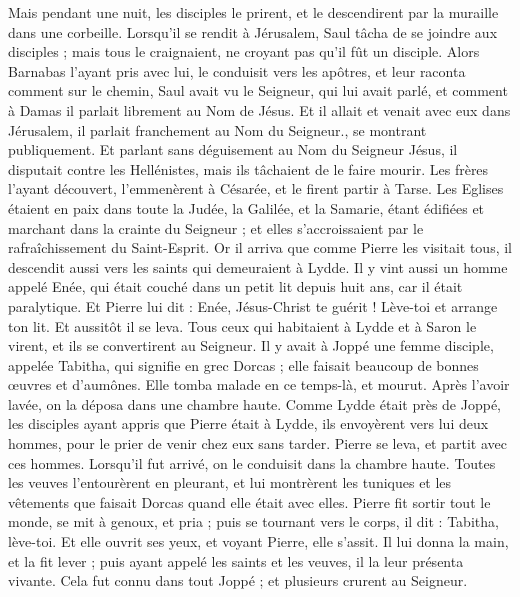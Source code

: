 \begin{multicols}{2}
Mais pendant une nuit, les disciples le prirent, et le descendirent par la muraille dans une corbeille.
Lorsqu'il se rendit à Jérusalem, Saul tâcha de se joindre aux disciples ; mais tous le craignaient, ne croyant pas qu'il fût un disciple.
Alors Barnabas l'ayant pris avec lui, le conduisit vers les apôtres, et leur raconta comment sur le chemin, Saul avait vu le Seigneur, qui lui avait parlé, et comment à Damas il parlait librement au Nom de Jésus.
Et il allait et venait avec eux dans Jérusalem, il parlait franchement au Nom du Seigneur., se montrant publiquement.
Et parlant sans déguisement au Nom du Seigneur Jésus, il disputait contre les Hellénistes, mais ils tâchaient de le faire mourir.
Les frères l'ayant découvert, l'emmenèrent à Césarée, et le firent partir à Tarse.
Les Eglises étaient en paix dans toute la Judée, la Galilée, et la Samarie, étant édifiées et marchant dans la crainte du Seigneur ; et elles s'accroissaient par le rafraîchissement du Saint-Esprit.
Or il arriva que comme Pierre les visitait tous, il descendit aussi vers les saints qui demeuraient à Lydde.
Il y vint aussi un homme appelé Enée, qui était couché dans un petit lit depuis huit ans, car il était paralytique.
Et Pierre lui dit : Enée, Jésus-Christ te guérit ! Lève-toi et arrange ton lit. Et aussitôt il se leva.
Tous ceux qui habitaient à Lydde et à Saron le virent, et ils se convertirent au Seigneur.
Il y avait à Joppé une femme disciple, appelée Tabitha, qui signifie en grec Dorcas ; elle faisait beaucoup de bonnes œuvres et d'aumônes.
Elle tomba malade en ce temps-là, et mourut. Après l'avoir lavée, on la déposa dans une chambre haute.
Comme Lydde était près de Joppé, les disciples ayant appris que Pierre était à Lydde, ils envoyèrent vers lui deux hommes, pour le prier de venir chez eux sans tarder.
Pierre se leva, et partit avec ces hommes. Lorsqu'il fut arrivé, on le conduisit dans la chambre haute. Toutes les veuves l'entourèrent en pleurant, et lui montrèrent les tuniques et les vêtements que faisait Dorcas quand elle était avec elles.
Pierre fit sortir tout le monde, se mit à genoux, et pria ; puis se tournant vers le corps, il dit : Tabitha, lève-toi. Et elle ouvrit ses yeux, et voyant Pierre, elle s'assit.
Il lui donna la main, et la fit lever ; puis ayant appelé les saints et les veuves, il la leur présenta vivante.
Cela fut connu dans tout Joppé ; et plusieurs crurent au Seigneur.

\end{multicols}
